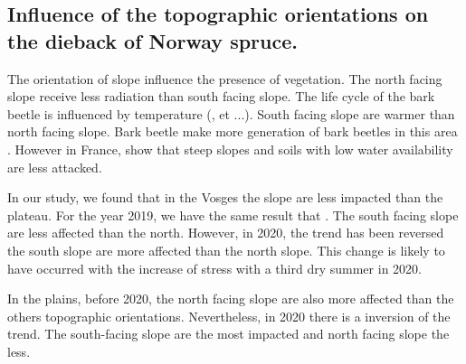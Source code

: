\documentclass[3p,procedia]{elsarticle}
\begin{document}




	


\subsection{Influence of the topographic orientations on the dieback of Norway spruce.}


The orientation of slope influence the presence of vegetation. The north facing slope receive less radiation than south facing slope. 
The life cycle of the bark beetle is influenced by temperature (\cite{baier_phenipscomprehensive_2007}, et ...). South facing slope are warmer than north facing slope.
Bark beetle make more generation of bark beetles in this area \cite{}. 
However in France, \cite{nardi_drought_2022} show that steep slopes and soils with low water availability are less attacked. 

In our study, we found that in the Vosges the slope are less impacted than the plateau. 
For the year 2019, we have the same result that \cite{nardi_drought_2022}. 
The south facing slope are less affected than the north. 
However, in 2020, the trend has been reversed the south slope are more affected than the north slope. 
This change is likely to have occurred with the increase of stress with a third dry summer in 2020.

In the plains, before 2020, the north facing slope are also more affected than the others topographic orientations. 
Nevertheless, in 2020 there is a inversion of the trend. 
The south-facing slope are the most impacted and north facing slope the less.
\end{document}
